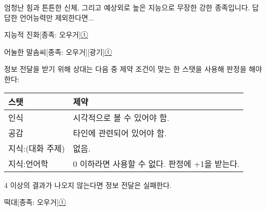 \documentclass{report}
\begin{document}
	엄청난 힘과 튼튼한 신체, 그리고 예상외로 높은 지능으로 무장한 강한 종족입니다. 답답한 언어능력만 제외한다면...
	
	\begin{story}{지능적 진화}{[종족: 오우거]\hyperlink{celesteela}{ⓣ}}
		
	\end{story}
	
	\begin{story}{어눌한 말솜씨}{[종족: 오우거][광기]\hyperlink{celesteela}{ⓣ}}
		{정보 전달을 받기 위해 상대는 다음 중 제약 조건이 맞는 한 스탯을 사용해 판정을 해야한다:
		
		\begin{center}
			\begin{tabular}{l|l}
				\textbf{스탯}    & \textbf{제약}                                  \\\hline\hline
				인식             & 시각적으로 볼 수 있어야 함.                    \\\hline
				공감             & 타인에 관련되어 있어야 함.                     \\\hline
				지식:(대화 주제) & 없음.                                          \\\hline
				지식:언어학      & 0 이하라면 사용할 수 없다. 판정에 +1을 받는다.
			\end{tabular}
		\end{center}
		
		4 이상의 결과가 나오지 않는다면 정보 전달은 실패한다.}
		
		
	\end{story}
	
	\begin{story}{떡대}{[종족: 오우거]\hyperlink{celesteela}{ⓣ}}
		
		
		
	\end{story}
\end{document}
